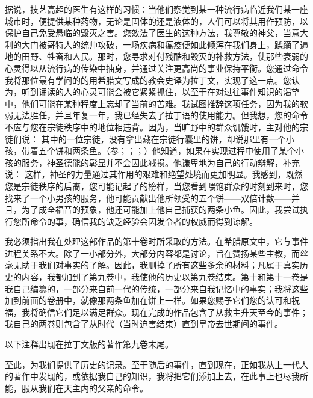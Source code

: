 据说，技艺高超的医生有这样的习惯：当他们察觉到某一种流行病临近我们某一座城市时，便提供某种药物，无论是固体的还是液体的，人们可以将其用作预防，以保护自己免受悬临的毁灭之害。您效法了医生的这种方法，我尊敬的神父，当意大利的大门被哥特人的统帅攻破，一场疾病和瘟疫便如此倾泻在我们身上，蹂躏了遍地的田野、牲畜和人民。那时，您寻求对付残酷和毁灭的补救方法，使那些衰弱的心灵得以从流行病的传染中抽身，并通过关注更高尚的事业保持平衡。您通过命令我将那位最有学问的的用希腊文写成的教会史译为拉丁文，实现了这一点。您认为，听到诵读的人的心灵可能会被它紧紧抓住，以至于在对过往事件知识的渴望中，他们可能在某种程度上忘却了当前的苦难。我试图推辞这项任务，因为我的软弱无法胜任，并且年复一年，我已经失去了拉丁语的使用能力。但我想，您的命令不应与您在宗徒秩序中的地位相违背。因为，当旷野中的群众饥饿时，主对他的宗徒们说： 其中的一位宗徒，没有拿出藏在宗徒行囊里的饼，却说那里有一个小孩，带着五个饼和两条鱼。（参；；；）他知道，如果在实现过程中使用了某个小孩的服务，神圣德能的彰显并不会因此减损。他谦卑地为自己的行动辩解，补充说： 这样，神圣的力量通过其作用的艰难和绝望处境而更加明显。我感到，既然您是宗徒秩序的后裔，您可能记起了的榜样，当您看到喂饱群众的时刻到来时，您找来了一个小男孩的服务，他可能贡献出他所领受的五个饼——双倍计数——并且，为了成全福音的预象，他还可能加上他自己捕获的两条小鱼。因此，我尝试执行您所命令的事，确信我的缺乏经验会因发令者的权威而得到谅解。\par

我必须指出我在处理这部作品的第十卷时所采取的方法。在希腊原文中，它与事件进程关系不大。除了一小部分外，大部分内容都是讨论，旨在赞扬某些主教，而丝毫无助于我们对事实的了解。因此，我删掉了所有这些多余的材料；凡属于真实历史的内容，我都加到了第九卷中，我使他的历史以第九卷结束。第十和第十一卷是我自己编纂的，一部分来自前一代的传统，一部分来自我记忆中的事实；我将这些加到前面的卷册中，就像那两条鱼加在饼上一样。如果您赐予它们您的认可和祝福，我将确信它们足以满足群众。现在完成的作品包含了从救主升天至今的事件；我自己的两卷则包含了从时代（当时迫害结束）直到皇帝去世期间的事件。\par

以下注释出现在拉丁文版的著作第九卷末尾。\par

至此，为我们提供了历史的记录。至于随后的事件，直到现在，正如我从上一代人的著作中发现的，或依据我自己的知识，我将把它们添加上去，在此事上也尽我所能，服从我们在天主内的父亲的命令。\par

